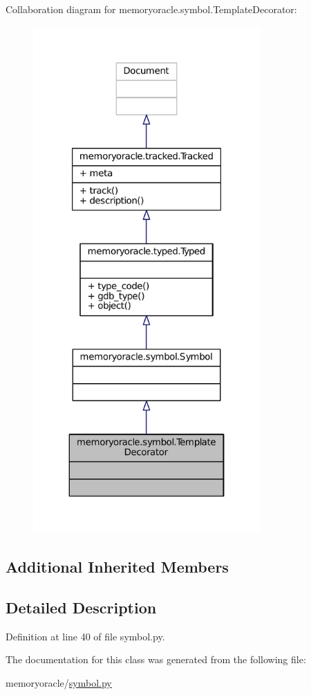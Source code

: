Collaboration diagram for memoryoracle.\+symbol.\+Template\+Decorator\+:
\nopagebreak
\begin{figure}[H]
\begin{center}
\leavevmode
\includegraphics[height=550pt]{classmemoryoracle_1_1symbol_1_1TemplateDecorator__coll__graph}
\end{center}
\end{figure}
\subsection*{Additional Inherited Members}


\subsection{Detailed Description}


Definition at line 40 of file symbol.\+py.



The documentation for this class was generated from the following file\+:\begin{DoxyCompactItemize}
\item 
memoryoracle/\hyperlink{symbol_8py}{symbol.\+py}\end{DoxyCompactItemize}
